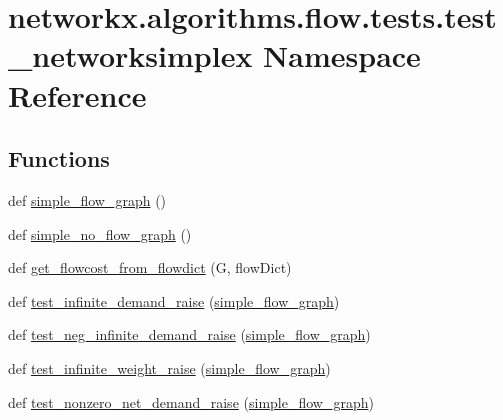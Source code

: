 \hypertarget{namespacenetworkx_1_1algorithms_1_1flow_1_1tests_1_1test__networksimplex}{}\section{networkx.\+algorithms.\+flow.\+tests.\+test\+\_\+networksimplex Namespace Reference}
\label{namespacenetworkx_1_1algorithms_1_1flow_1_1tests_1_1test__networksimplex}
\subsection*{Functions}
\begin{DoxyCompactItemize}
\item 
def \hyperlink{namespacenetworkx_1_1algorithms_1_1flow_1_1tests_1_1test__networksimplex_a305eb5523aa6c08c741304317ee53b4f}{simple\+\_\+flow\+\_\+graph} ()
\item 
def \hyperlink{namespacenetworkx_1_1algorithms_1_1flow_1_1tests_1_1test__networksimplex_a4b3331d62c725e39860663ede918722d}{simple\+\_\+no\+\_\+flow\+\_\+graph} ()
\item 
def \hyperlink{namespacenetworkx_1_1algorithms_1_1flow_1_1tests_1_1test__networksimplex_a8b52f97370dfbda97829cf6c8c2ff471}{get\+\_\+flowcost\+\_\+from\+\_\+flowdict} (G, flow\+Dict)
\item 
def \hyperlink{namespacenetworkx_1_1algorithms_1_1flow_1_1tests_1_1test__networksimplex_a41977332e6b9154b398d692bee42fdcd}{test\+\_\+infinite\+\_\+demand\+\_\+raise} (\hyperlink{namespacenetworkx_1_1algorithms_1_1flow_1_1tests_1_1test__networksimplex_a305eb5523aa6c08c741304317ee53b4f}{simple\+\_\+flow\+\_\+graph})
\item 
def \hyperlink{namespacenetworkx_1_1algorithms_1_1flow_1_1tests_1_1test__networksimplex_a359e0a6893705f2239a684561389150c}{test\+\_\+neg\+\_\+infinite\+\_\+demand\+\_\+raise} (\hyperlink{namespacenetworkx_1_1algorithms_1_1flow_1_1tests_1_1test__networksimplex_a305eb5523aa6c08c741304317ee53b4f}{simple\+\_\+flow\+\_\+graph})
\item 
def \hyperlink{namespacenetworkx_1_1algorithms_1_1flow_1_1tests_1_1test__networksimplex_ade3d5d4465b10aa88e3debeb72553abe}{test\+\_\+infinite\+\_\+weight\+\_\+raise} (\hyperlink{namespacenetworkx_1_1algorithms_1_1flow_1_1tests_1_1test__networksimplex_a305eb5523aa6c08c741304317ee53b4f}{simple\+\_\+flow\+\_\+graph})
\item 
def \hyperlink{namespacenetworkx_1_1algorithms_1_1flow_1_1tests_1_1test__networksimplex_a939f5b95a287f3f611e24cdf08a3a7e3}{test\+\_\+nonzero\+\_\+net\+\_\+demand\+\_\+raise} (\hyperlink{namespacenetworkx_1_1algorithms_1_1flow_1_1tests_1_1test__networksimplex_a305eb5523aa6c08c741304317ee53b4f}{simple\+\_\+flow\+\_\+graph})

\end{DoxyCompactItemize}
